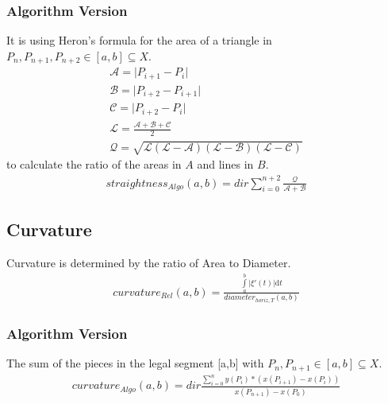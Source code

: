\documentclass{report}
\begin{document}
\subsubsection{Algorithm Version}
It is using Heron's formula for the area of a triangle in $P_{n}, P_{n+1},P_{n+2} \in [a,b] \subseteq X$.
\begin{align*}
\mathcal{A}=\lvert P_{i+1}-P_{i} \rvert\\
\mathcal{B}=\lvert P_{i+2} - P_{i+1} \rvert\\
\mathcal{C}=\lvert P_{i+2} - P_{i} \rvert\\
\mathcal{L}=\frac{\mathcal{A}+\mathcal{B}+\mathcal{C}}{2}\\
\mathcal{Q}=\sqrt{\mathcal{L}(\mathcal{L}-\mathcal{A})(\mathcal{L}-\mathcal{B})(\mathcal{L}-\mathcal{C})}
\end{align*}
to calculate the ratio of the areas in $A$ and lines in $B$.
\begin{align}
straightness_{Algo}(a,b)=dir \sum_{i=0}^{n+2}\frac{\mathcal{Q}}{\mathcal{A}+\mathcal{B}}
\end{align}

\subsection{Curvature}
Curvature is determined by the ratio of Area to Diameter.
\begin{align}
curvature_{Rel}(a,b) = \frac{\int \limits _{a}^{b} \lvert \xi'(t) \rvert \mathrm{d}t}{diameter_{horiz,T}(a,b)}
\end{align}
\subsubsection{Algorithm Version}
The sum of the pieces in the legal segment [a,b] with $P_{n}, P_{n+1} \in [a,b] \subseteq X$.
\begin{align}
curvature_{Algo}(a,b)= dir \frac{\sum \limits _{i=0}^{n}y(P_{i})*(x(P_{i+1})-x(P_{i}))}{x(P_{n+1})-x(P_{0})}
\end{align}
\end{document}
